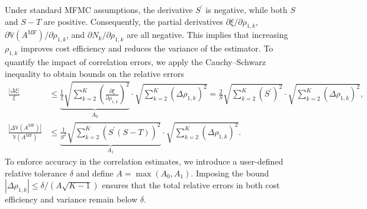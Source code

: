 %
Under standard MFMC assumptions, the derivative $S^\prime$ is negative, while both $S$ and $S - T$ are positive. Consequently, the partial derivatives $\partial \xi / \partial \rho_{1,k}$, $\partial \mathbb{V}(A^{\text{MF}}) / \partial \rho_{1,k}$, and $\partial N_k / \partial \rho_{1,k}$ are all negative. This implies that increasing $\rho_{1,k}$ improves cost efficiency and reduces the variance of the estimator. To quantify the impact of correlation errors, we apply the Cauchy–Schwarz inequality to obtain bounds on the relative errors
%
\begin{align}
\label{eq:delta_xi_bound}
    \frac{\left|\Delta \xi\right|}{\xi}&\le \underbrace{\frac{1}{\xi}\sqrt{\sum_{k=2}^K \left(\frac{\partial \xi}{\partial \rho_{1,k}}\right)^2}}_{A_0} \cdot \sqrt{\sum_{k=2}^K\left(\Delta\rho_{1,k}\right)^2}=\frac{2}{S}\sqrt{\sum_{k=2}^K(S^\prime)^2} \cdot \sqrt{\sum_{k=2}^K\left(\Delta\rho_{1,k}\right)^2},\\
    \label{eq:delta_var_bound}
    \frac{\left|\Delta \mathbb{V}\left(A^{\text{MF}}\right)\right|}{\mathbb{V}\left(A^{\text{MF}}\right)}&\le
    \underbrace{\frac{1}{S^2}\sqrt{\sum_{k=2}^K\left(S^\prime \left(S-T\right)\right)^2}}_{A_1}\cdot \sqrt{\sum_{k=2}^K\left(\Delta\rho_{1,k}\right)^2}.
\end{align}
%
To enforce accuracy in the correlation estimates, we introduce a user-defined relative tolerance $\delta$ and define $A = \max(A_0, A_1)$. Imposing the bound $|\Delta \rho_{1,k}| \le \delta / (A \sqrt{K - 1})$ ensures that the total relative errors in both cost efficiency and variance remain below $\delta$.








